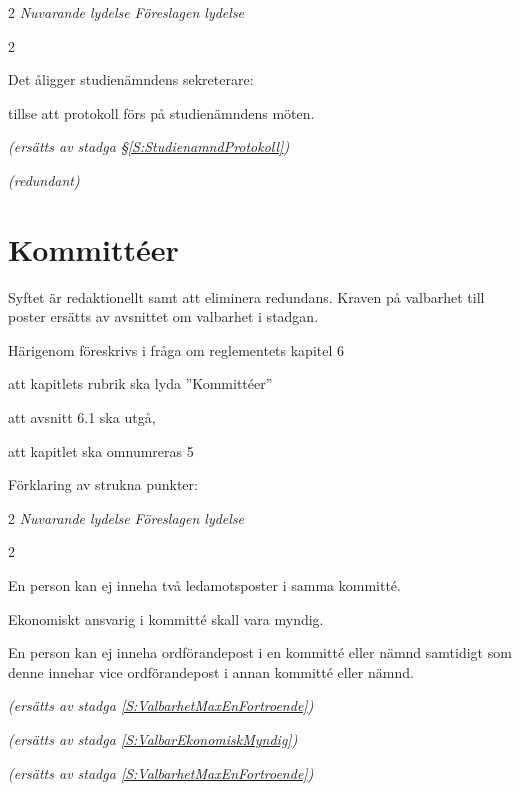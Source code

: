 \documentclass{article}
\newenvironment{lydelse}
    {\begin{paracol}{2}%
        \emph{Nuvarande lydelse}%
        \switchcolumn%
        \emph{Föreslagen lydelse}%
    \end{paracol}%
    \begin{enumerate}[label=\thesubsection.\arabic*]%
    \begin{paracol}{2}%
    }{\end{paracol}\end{enumerate}}
\begin{document}
\begin{lydelse}
    \item Det åligger studienämndens sekreterare:
    \begin{aligganden}
         \item tillse att protokoll förs på studienämndens möten.
         \item[] \emph{(ersätts av stadga \S \ref{S:StudienamndProtokoll})}
    \end{aligganden}
    \begin{aligganden}
        \item[] \emph{(redundant)}
    \end{aligganden}
\end{lydelse}

\section{Kommittéer}
Syftet är redaktionellt samt att eliminera redundans.
Kraven på valbarhet till poster ersätts av avsnittet om valbarhet i stadgan.

Härigenom föreskrivs i fråga om reglementets kapitel 6

\begin{dels}
    \item att kapitlets rubrik ska lyda ''Kommittéer''
    \item att avsnitt 6.1 ska utgå,
    \item att kapitlet ska omnumreras 5
\end{dels}

Förklaring av strukna punkter:
\begin{lydelse}
    \setcounter{section}{6}
    \setcounter{subsection}{1}
    \item En person kan ej inneha två ledamotsposter i samma kommitté.
	\item Ekonomiskt ansvarig i kommitté skall vara myndig.
	\item En person kan ej inneha ordförandepost i en kommitté eller nämnd samtidigt som denne innehar vice ordförandepost i annan kommitté eller nämnd.
	\setcounter{section}{5}
    \switchcolumn
    
    \item[] \emph{(ersätts av stadga \ref{S:ValbarhetMaxEnFortroende})}\vspace{1.2em}
    \item[] \emph{(ersätts av stadga \ref{S:ValbarEkonomiskMyndig})}\vspace{1.2em}
    \item[] \emph{(ersätts av stadga \ref{S:ValbarhetMaxEnFortroende})}
    
\end{lydelse}
\end{document}
